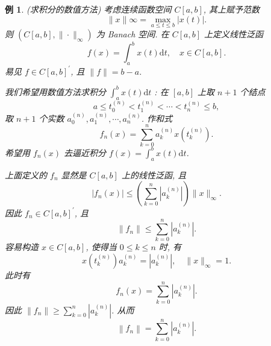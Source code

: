 \documentclass[openany]{ctexbook}
\theoremstyle{kaiti}
\theoremstyle{normal}
\newtheorem{example}{例}[section]
\begin{document}
\begin{example}
(求积分的数值方法) 考虑连续函数空间 $C[a, b]$, 其上赋予范数
$$
\|x\| \infty=\max_{a \leqslant t \leqslant b}|x(t)|.
$$
则 $\left(C[a, b],\|\cdot\|_{\infty}\right)$ 为 Banach 空间. 在 $C[a, b]$ 上定义线性泛函
$$
f(x)=\int_{a}^{b} x(t) \mathrm{d} t, \quad x \in C[a, b].
$$
易见 $f \in C[a, b]^{\prime}$, 且 $\|f\|=b-a$.

我们希望用数值方法求积分 $\int_{a}^{b} x(t) \mathrm{d} t$ : 在 $[a, b]$ 上取 $n+1$ 个结点
$$
a \leqslant t_0^{(n)}<t_1^{(n)}<\cdots<t_n^{(n)} \leqslant b,
$$
取 $n+1$ 个实数 $a_0^{(n)}, a_1^{(n)}, \cdots, a_n^{(n)}$. 作和式
$$
f_n(x)=\sum_{k=0}^n a_{k}^{(n)} x\left(t_{k}^{(n)}\right).
$$
希望用 $f_n(x)$ 去逼近积分 $f(x)=\int_{a}^{b} x(t) \mathrm{d} t$.

上面定义的 $f_n$ 显然是 $C[a, b]$ 上的线性泛函, 且
$$
\left|f_n(x)\right| \leqslant\left(\sum_{k=0}^n\left|a_{k}^{(n)}\right|\right)\|x\|_{\infty}.
$$
因此 $f_n \in C[a, b]^{\prime}$, 且
$$
\left\|f_n\right\| \leqslant \sum_{k=0}^n\left|a_{k}^{(n)}\right|.
$$
容易构造 $x \in C[a, b]$, 使得当 $0 \leqslant k \leqslant n$ 时, 有
$$
x\left(t_{k}^{(n)}\right) a_{k}^{(n)}=\left|a_{k}^{(n)}\right|, \quad\|x\|_{\infty}=1.
$$
此时有
$$
f_n(x)=\sum_{k=0}^n\left|a_{k}^{(n)}\right|.
$$
因此 $\left\|f_n\right\| \geqslant \sum_{k=0}^n\left|a_{k}^{(n)}\right|$. 从而
$$
\left\|f_n\right\|=\sum_{k=0}^n\left|a_{k}^{(n)}\right|.
$$


\end{example}
\end{document}
